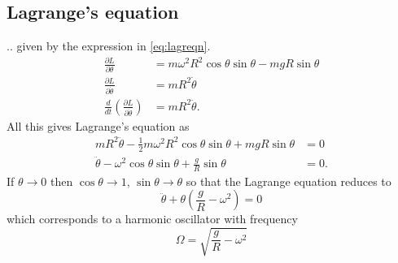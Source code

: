 \documentclass[11pt]{amsart}
\begin{document}
\subsection{Lagrange's equation}
.. given by the expression in \ref{eq:lagreqn}.
\begin{align*}
\frac{\partial L}{\partial \theta} &= m\omega^2R^2\cos\theta\sin\theta - mgR\sin\theta \\
\frac{\partial L}{\partial \dot{\theta}} &= mR^2\dot{\theta} \\
\frac{d}{dt}\left(\frac{\partial L}{\partial \dot{\theta}} \right)
&= mR^2\ddot{\theta}.
\end{align*}
All this gives Lagrange's equation as
\begin{align*}
mR^2\ddot{\theta} - \frac{1}{2}m\omega^2R^2\cos\theta\sin\theta + mgR\sin\theta &= 0 \\
\ddot{\theta} - \omega^2\cos\theta\sin\theta + \frac{g}{R}\sin\theta &= 0.
\end{align*}
If $\theta \to 0$ then $\cos\theta \to 1$, $\sin\theta \to \theta$ so that the Lagrange equation reduces to
\begin{equation}
\label{eq:oscillatorpen}
\ddot{\theta} + \theta\left(\frac{g}{R}-\omega^2 \right) = 0
\end{equation}
which corresponds to a harmonic oscillator with frequency
\begin{equation*}
\Omega = \sqrt{\frac{g}{R}-\omega^2}
\end{equation*}
\end{document}
